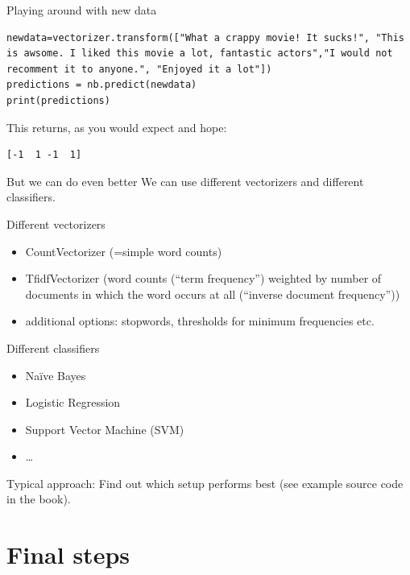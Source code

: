 \documentclass{beamer}
\begin{document}
\begin{frame}[fragile]{Playing around with new data}
\begin{lstlisting}
newdata=vectorizer.transform(["What a crappy movie! It sucks!", "This is awsome. I liked this movie a lot, fantastic actors","I would not recomment it to anyone.", "Enjoyed it a lot"])
predictions = nb.predict(newdata)
print(predictions)
\end{lstlisting}
This returns, as you would expect and hope:
\begin{lstlisting} 
[-1  1 -1  1]
\end{lstlisting}


\end{frame}




\begin{frame}{But we can do even better}
We can use different vectorizers and different classifiers.
\end{frame}

\begin{frame}{Different vectorizers}
\begin{itemize}
\item CountVectorizer (=simple word counts)
\item TfidfVectorizer (word counts (``term frequency'') weighted by number of documents in which the word occurs at all (``inverse document frequency''))
\item additional options: stopwords, thresholds for minimum frequencies etc.
\end{itemize}
\end{frame}

\begin{frame}{Different classifiers}
\begin{itemize}
\item Naïve Bayes
\item Logistic Regression
\item Support Vector Machine (SVM)
\item \ldots
\end{itemize}
Typical approach: Find out which setup performs best (see example source code in the book).
\end{frame}














\section{Final steps}
\end{document}
